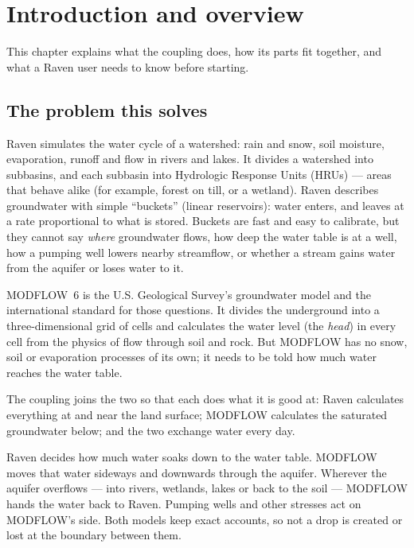 \chapter{Introduction and overview}\label{ch:c1}\label{ch:intro}
This chapter explains what the coupling does, how its parts fit together, and what a Raven user needs to know before
starting.

\section{The problem this solves}
Raven \cite{craig2020raven} simulates the water cycle of a watershed: rain and snow, soil moisture, evaporation,
runoff and flow in rivers and lakes. It divides a watershed into subbasins, and each subbasin into Hydrologic
Response Units (HRUs) --- areas that behave alike (for example, forest on till, or a wetland). Raven describes
groundwater with simple ``buckets'' (linear reservoirs): water enters, and leaves at a rate proportional to what is
stored. Buckets are fast and easy to calibrate, but they cannot say \emph{where} groundwater flows, how deep the water
table is at a well, how a pumping well lowers nearby streamflow, or whether a stream gains water from the aquifer or
loses water to it.

MODFLOW~6 \cite{langevin2017mf6} is the U.S. Geological Survey's groundwater model and the international standard for
those questions. It divides the underground into a three-dimensional grid of cells and calculates the water level
(the \emph{head}) in every cell from the physics of flow through soil and rock. But MODFLOW has no snow, soil or
evaporation processes of its own; it needs to be told how much water reaches the water table.

The coupling joins the two so that each does what it is good at: Raven calculates everything at and near the land
surface; MODFLOW calculates the saturated groundwater below; and the two exchange water every day.

\begin{plain}
Raven decides how much water soaks down to the water table. MODFLOW moves that water sideways and downwards through
the aquifer. Wherever the aquifer overflows --- into rivers, wetlands, lakes or back to the soil --- MODFLOW hands the
water back to Raven. Pumping wells and other stresses act on MODFLOW's side. Both models keep exact accounts, so not
a drop is created or lost at the boundary between them.
\end{plain}

